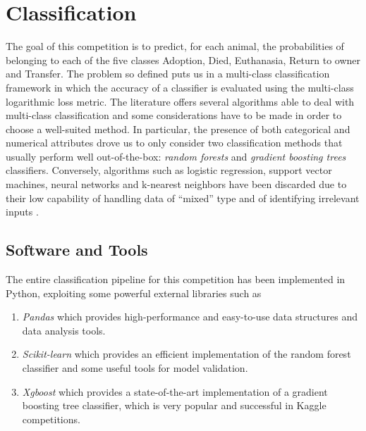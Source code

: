 \documentclass[a4paper,11pt]{article}
\begin{document}
\section{Classification}
The goal of this competition is to predict, for each animal, the probabilities of belonging to each of the five classes Adoption, Died, Euthanasia, Return to owner and Transfer. The problem so defined puts us in a multi-class classification framework in which the accuracy of a classifier is evaluated using the multi-class logarithmic loss metric. The literature offers several algorithms able to deal with multi-class classification and some considerations have to be made in order to choose a well-suited method. In particular, the presence of both categorical and numerical attributes drove us to only consider two classification methods that usually perform well out-of-the-box: \emph{random forests} and \emph{gradient boosting trees} classifiers. Conversely, algorithms such as logistic regression, support vector machines, neural networks and k-nearest neighbors have been discarded due to their low capability of handling data of ``mixed'' type and of identifying irrelevant inputs \cite{friedman2009elements}. 

\subsection{Software and Tools}
The entire classification pipeline for this competition has been implemented in Python, exploiting some powerful external libraries such as 
\begin{enumerate}
	\item \textit{Pandas} which provides high-performance and easy-to-use data structures and data analysis tools.
	\item \textit{Scikit-learn}\cite{scikit-learn} which provides an efficient implementation of the random forest classifier and some useful tools for model validation.
	\item \textit{Xgboost}\cite{chen2015xgboost} which provides a state-of-the-art implementation of a gradient boosting tree classifier, which is very popular and successful in Kaggle competitions.  
\end{enumerate}
\end{document}
